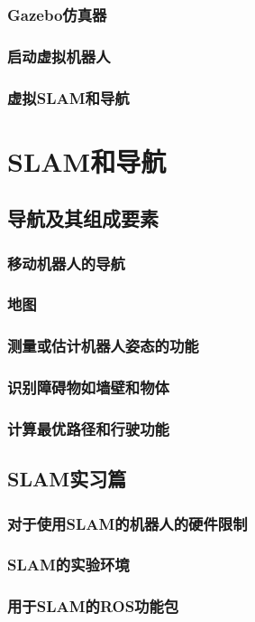 \documentclass[geye,green,kindle,cn]{elegantnote}
\begin{document}
\subsubsection{Gazebo仿真器}
\subsubsection{启动虚拟机器人}
\subsubsection{虚拟SLAM和导航}
\section{SLAM和导航}
\subsection{导航及其组成要素}
\subsubsection{移动机器人的导航}
\subsubsection{地图}
\subsubsection{测量或估计机器人姿态的功能}
\subsubsection{识别障碍物如墙壁和物体}
\subsubsection{计算最优路径和行驶功能}
\subsection{SLAM实习篇}
\subsubsection{对于使用SLAM的机器人的硬件限制}
\subsubsection{SLAM的实验环境}
\subsubsection{用于SLAM的ROS功能包}
\end{document}
